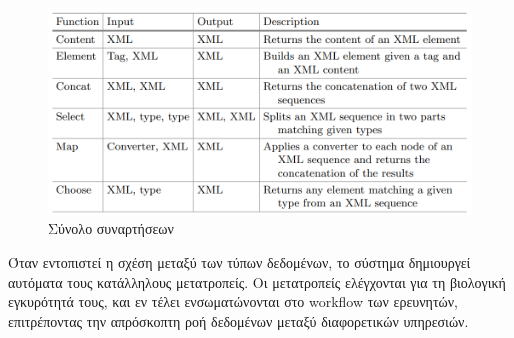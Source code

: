         \begin{figure}[h!] \noindent\centering
            \includegraphics[scale=0.7]{img/Converter}
            \caption{Σύνολο συναρτήσεων \cite{TransactionsonLargeScale}}
        \end{figure}

        Όταν εντοπιστεί η σχέση μεταξύ των τύπων δεδομένων, το σύστημα δημιουργεί αυτόματα τους κατάλληλους μετατροπείς.
        Οι μετατροπείς ελέγχονται για τη βιολογική εγκυρότητά τους, και εν τέλει ενσωματώνονται στο workflow των ερευνητών, επιτρέποντας την απρόσκοπτη ροή δεδομένων μεταξύ διαφορετικών υπηρεσιών.
